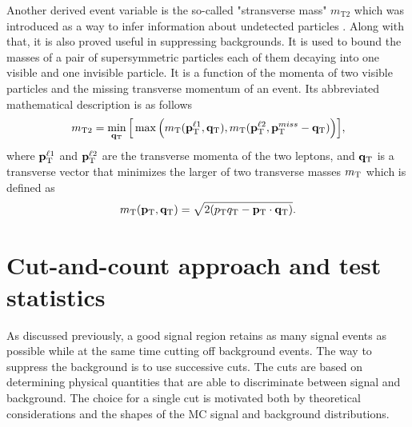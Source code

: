 Another derived event variable is the so-called "stransverse mass"  $m_{\text {T2}}$ which was introduced as a way to infer information about undetected particles \citep{Lester:1999tx,Barr:2003rg}. Along with that, it is also proved useful in suppressing backgrounds. It is used to bound the masses of a pair of supersymmetric particles each of them decaying into one visible and one invisible particle. It is a function of the momenta of two visible particles and the missing transverse momentum of an event. Its abbreviated mathematical description is as follows
\begin{equation}
m_{\text{T2}} = \min_{\mathbf{q}_{\text T}}\Big [\max \Big ( m_{\text T} (\mathbf{p}_{\text T}^{\ell 1},\mathbf{q}_{\text T}),m_{\text T}(\mathbf{p}_{\text T}^{\ell 2},\mathbf{p}_{\text T}^{miss}-\mathbf{q}_{\text T}) \Big ) \Big ] ,
\end{equation}
where $\mathbf{p}_{\text T}^{\ell 1}$ and $\mathbf{p}_{\text T}^{\ell 2}$ are the transverse momenta of the two leptons, and $ \mathbf{q}_{\text T}$ is a transverse vector that minimizes the larger of two transverse masses $m_{\text T}$ which is defined as
\begin{equation}
m_{\text T}(\mathbf{p}_{\text T},\mathbf{q}_{\text T}) = \sqrt{2(p_{\text T}q_{\text T} - \mathbf{p}_{\text T} \cdot \mathbf{q}_{\text T})}.
\end{equation}


\section{Cut-and-count approach and test statistics}
\label{subsec:stat}
As discussed previously, a good signal region retains as many signal events as possible while at the same time cutting off background events. The way to suppress the background is to use successive cuts. The cuts are based on determining physical quantities that are able to discriminate between signal and background. The choice for a single cut is motivated both by theoretical considerations and the shapes of the MC   signal and background distributions. 

